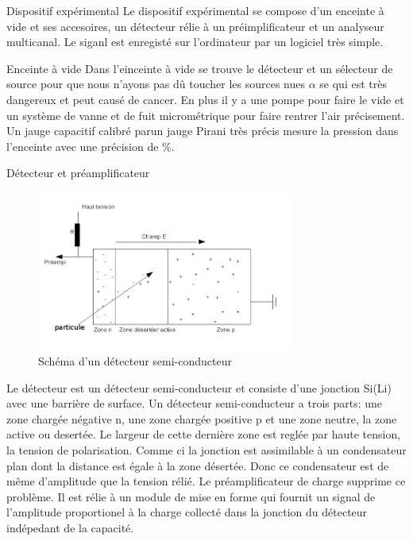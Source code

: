 \documentclass[a4paper,11pt]{scrartcl}
\begin{document}
 \begin{section}{Dispositif expérimental}
  Le dispositif expérimental se compose d'un enceinte à vide et ses accesoires, un détecteur rélie à un préimplificateur et un analyseur multicanal. Le siganl est enregisté sur l'ordinateur par un logiciel très simple.
  \begin{subsection}{Enceinte à vide}
   Dans l'einceinte à vide se trouve le détecteur et un sélecteur de source pour que nous n'ayons pas dû toucher les sources nues $\alpha$ se qui est très dangereux et peut causé de cancer. En plus il y a une pompe pour faire le vide et un système de vanne et de fuit micrométrique pour faire rentrer l'air précisement. Un jauge capacitif calibré parun jauge Pirani très précis mesure la pression dans l'enceinte avec une précision de \unit[0,2]{\%}.  
  \end{subsection}

  \begin{subsection}{Détecteur et préamplificateur}
\enlargethispage{1cm}
   \begin{figure}[hbt]
    \begin{center}
     \includegraphics[width=0.75\textwidth]{Bilder/detecteur.png}
    \end{center}
    \caption{Schéma d'un détecteur semi-conducteur}
   \end{figure}
   Le détecteur est un détecteur semi-conducteur et consiste d'une jonction Si(Li) avec une barrière de surface. Un détecteur semi-conducteur a trois parts: une zone chargée négative n, une zone chargée positive p  et une zone neutre, la zone active ou desertée. Le largeur de cette dernière zone est reglée par haute tension, la tension de polarisation. Comme ci la jonction est assimilable à un condensateur plan dont la distance est égale à la zone désertée. Donc ce condensateur est de même d'amplitude que la tension rélié.
   Le préamplificateur de charge supprime ce problème. Il est rélie à un module de mise en forme qui fournit un signal de l'amplitude proportionel à la charge collecté dans la jonction du détecteur indépedant de la capacité.
  \end{subsection}


\end{section}
\end{document}
